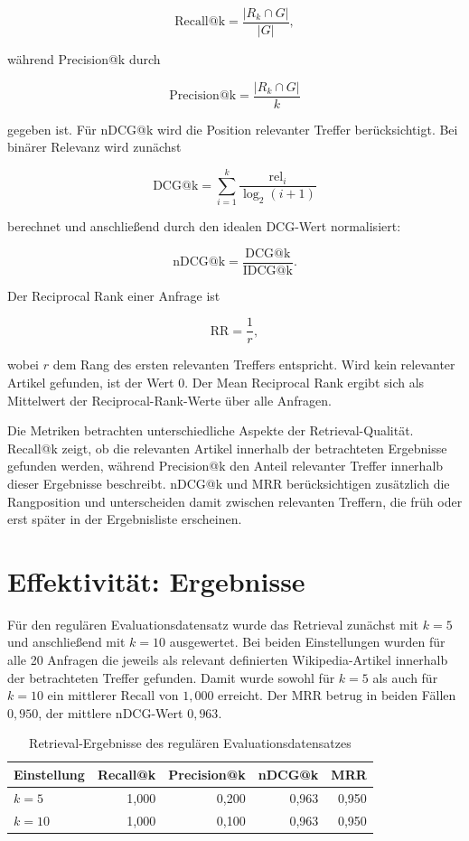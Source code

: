 \[
\mathrm{Recall@k} = \frac{|R_k \cap G|}{|G|},
\]

während Precision@k durch

\[
\mathrm{Precision@k} = \frac{|R_k \cap G|}{k}
\]

\par\smallskip
\noindent\begin{minipage}[t]{\linewidth}
gegeben ist. Für nDCG@k wird die Position relevanter Treffer
berücksichtigt. Bei binärer Relevanz wird zunächst

\[
\mathrm{DCG@k} =
\sum_{i=1}^{k}
\frac{\mathrm{rel}_i}{\log_2(i+1)}
\]
\end{minipage}\par\smallskip

berechnet und anschließend durch den idealen DCG-Wert normalisiert:

\[
\mathrm{nDCG@k} =
\frac{\mathrm{DCG@k}}{\mathrm{IDCG@k}}.
\]

Der Reciprocal Rank einer Anfrage ist

\[
\mathrm{RR} = \frac{1}{r},
\]

wobei $r$ dem Rang des ersten relevanten Treffers entspricht. Wird kein
relevanter Artikel gefunden, ist der Wert 0. Der Mean Reciprocal Rank ergibt
sich als Mittelwert der Reciprocal-Rank-Werte über alle Anfragen.

Die Metriken betrachten unterschiedliche Aspekte der Retrieval-Qualität.
Recall@k zeigt, ob die relevanten Artikel innerhalb der betrachteten
Ergebnisse gefunden werden, während Precision@k den Anteil relevanter
Treffer innerhalb dieser Ergebnisse beschreibt. nDCG@k und MRR
berücksichtigen zusätzlich die Rangposition und unterscheiden damit
zwischen relevanten Treffern, die früh oder erst später in der
Ergebnisliste erscheinen.

\section{Effektivität: Ergebnisse}

Für den regulären Evaluationsdatensatz wurde das Retrieval zunächst mit
$k=5$ und anschließend mit $k=10$ ausgewertet. Bei beiden Einstellungen
wurden für alle 20 Anfragen die jeweils als relevant definierten
Wikipedia-Artikel innerhalb der betrachteten Treffer gefunden. Damit wurde
sowohl für $k=5$ als auch für $k=10$ ein mittlerer Recall von $1{,}000$
erreicht. Der MRR betrug in beiden Fällen $0{,}950$, der mittlere nDCG-Wert
$0{,}963$.

\begin{table}[ht]
    \centering
    \caption{Retrieval-Ergebnisse des regulären Evaluationsdatensatzes}
    \label{tab:retrieval-regulaer}
    \begin{tabular}{lrrrr}
        \toprule
        Einstellung & Recall@k & Precision@k & nDCG@k & MRR \\
        \midrule
        $k=5$  & 1,000 & 0,200 & 0,963 & 0,950 \\
        $k=10$ & 1,000 & 0,100 & 0,963 & 0,950 \\
        \bottomrule
    \end{tabular}
\end{table}

